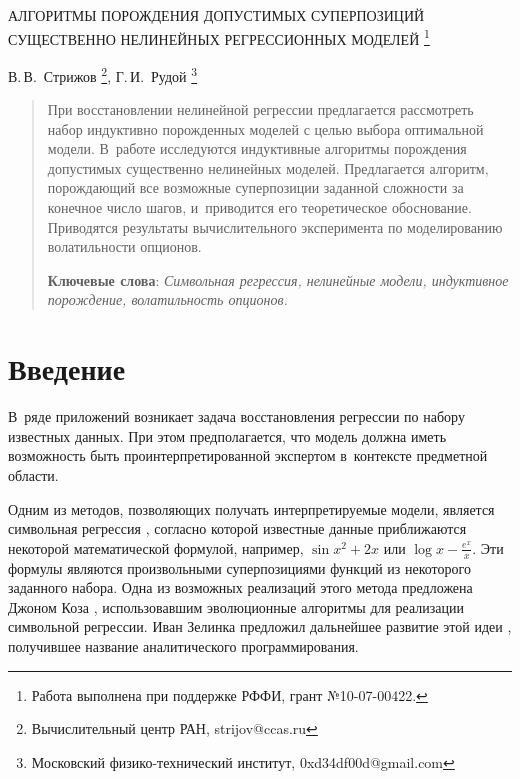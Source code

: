 \documentclass[12pt,a4paper]{article}
\begin{document}
\pagestyle{plain}
\lstset{language=C++}

\begin{center}
  АЛГОРИТМЫ ПОРОЖДЕНИЯ ДОПУСТИМЫХ СУПЕРПОЗИЦИЙ СУЩЕСТВЕННО НЕЛИНЕЙНЫХ РЕГРЕССИОННЫХ МОДЕЛЕЙ
	\footnote{Работа выполнена при поддержке РФФИ, грант №10-07-00422.}

  \bigskip
  В.\,В.~Стрижов \footnote{Вычислительный центр РАН, strijov@ccas.ru},
  Г.\,И.~Рудой \footnote{Московский физико-технический институт, 0xd34df00d@gmail.com}
\end{center}

\begin{abstract}
  При восстановлении нелинейной регрессии предлагается рассмотреть набор
  индуктивно порожденных моделей с целью выбора оптимальной модели. В~работе
  исследуются индуктивные алгоритмы порождения допустимых существенно
  нелинейных моделей. Предлагается алгоритм, порождающий все возможные
  суперпозиции заданной сложности за конечное число шагов, и~приводится его
  теоретическое обоснование. Приводятся результаты вычислительного эксперимента
  по моделированию волатильности опционов.

  \bigskip
  \textbf{Ключевые слова}: \emph{Символьная регрессия, нелинейные модели, индуктивное порождение,
	волатильность опционов.}
\end{abstract}

\section{Введение}

В~ряде приложений \cite{duffy:1999:srised,Barmpalexis201175,Schmidt:2009:GPTP}
возникает задача восстановления регрессии по набору известных данных.
При этом предполагается, что модель должна иметь возможность быть
проинтерпретированной экспертом в~контексте предметной области.

Одним из методов, позволяющих получать интерпретируемые модели, является
символьная регрессия \cite{davidson:2000:snrea, reference/ml/X10vc, StrijovW10},
согласно которой известные данные приближаются некоторой математической
формулой, например, $ \sin x^2 + 2x $ или $\log x - \frac{e^x}{x} $.
Эти формулы являются произвольными суперпозициями функций из некоторого
заданного набора. Одна из возможных реализаций этого метода
предложена Джоном Коза \cite{Koza1998GP, Koza1998Intro}, использовавшим
эволюционные алгоритмы для реализации символьной регрессии. Иван Зелинка
предложил дальнейшее развитие этой идеи \cite{Zelinka2008}, получившее
название аналитического программирования.
\end{document}
